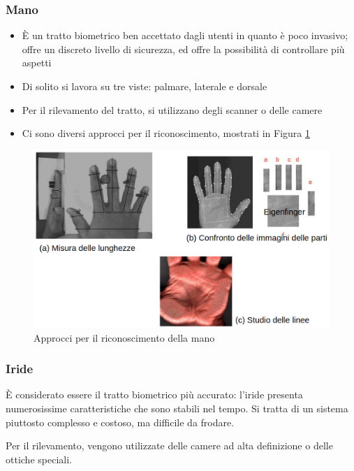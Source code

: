 \subsubsection{Mano}

\begin{itemize}
    \item È un tratto biometrico ben accettato dagli utenti in quanto è poco invasivo; offre un discreto livello di sicurezza, ed offre la possibilità di controllare più aspetti
    \item Di solito si lavora su tre viste: palmare, laterale e dorsale
    \item Per il rilevamento del tratto, si utilizzano degli scanner o delle camere
    \item Ci sono diversi approcci per il riconoscimento, mostrati in Figura \ref{fig:mano}
\end{itemize}


\begin{figure}
    \centering
    \includegraphics[width=1\linewidth]{chapters/images-chap1/mano.png}
    \caption{Approcci per il riconoscimento della mano}
    \label{fig:mano}
\end{figure}

\newpage

\subsubsection{Iride}

È considerato essere il tratto biometrico più accurato: l'iride presenta numerosissime caratteristiche che sono stabili nel tempo. Si tratta di un sistema piuttosto complesso e costoso, ma difficile da frodare.

\noindent Per il rilevamento, vengono utilizzate delle camere ad alta definizione o delle ottiche speciali.

